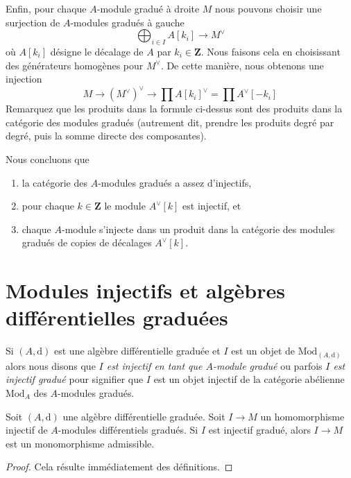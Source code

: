\medskip\noindent
Enfin, pour chaque $A$-module gradué à droite $M$ nous pouvons choisir une surjection
de $A$-modules gradués à gauche
$$
\bigoplus\nolimits_{i \in I} A[k_i] \to M^\vee
$$
où $A[k_i]$ désigne le décalage de $A$ par $k_i \in \mathbf{Z}$. Nous
faisons cela en choisissant des générateurs homogènes pour $M^\vee$. De cette
manière, nous obtenons une injection
$$
M \to (M^\vee)^\vee \to \prod A[k_i]^\vee = \prod A^\vee[-k_i]
$$
Remarquez que les produits dans la formule ci-dessus sont des produits
dans la catégorie des modules gradués (autrement dit, prendre les produits degré
par degré, puis la somme directe des composantes).

\medskip\noindent
Nous concluons que
\begin{enumerate}
\item la catégorie des $A$-modules gradués a assez d'injectifs,
\item pour chaque $k \in \mathbf{Z}$ le module $A^\vee[k]$ est injectif, et
\item chaque $A$-module s'injecte dans un produit dans la catégorie des
modules gradués de copies de décalages $A^\vee[k]$.
\end{enumerate}





\section{Modules injectifs et algèbres différentielles graduées}
\label{section-modules-noncommutative-differential-graded}

\noindent
Si $(A, \text{d})$ est une algèbre différentielle graduée et $I$ est
un objet de $\text{Mod}_{(A, \text{d})}$ alors nous disons
que {\it $I$ est injectif en tant que $A$-module gradué} ou
parfois {\it $I$ est injectif gradué} pour
signifier que $I$ est un objet injectif de la catégorie abélienne $\text{Mod}_A$ des
$A$-modules gradués.

\begin{lemma}
\label{lemma-source-graded-injective}
Soit $(A, \text{d})$ une algèbre différentielle
graduée. Soit $I \to M$ un homomorphisme injectif de $A$-modules
différentiels gradués. Si $I$ est injectif gradué, alors $I
\to M$ est un monomorphisme admissible.
\end{lemma}

\begin{proof}
Cela résulte immédiatement des définitions.
\end{proof}

